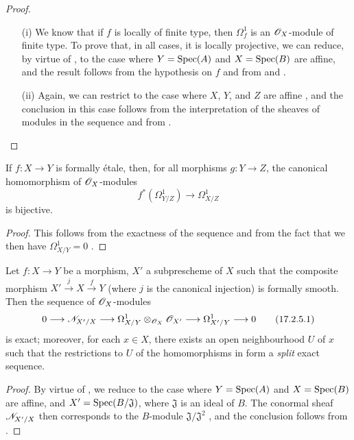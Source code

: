 \begin{proof}
\medskip\noindent
\begin{enumerate}
  \item[(i)] We know  that if $f$ is locally of finite type, then $\Omega_f^1$ is an $\mathscr{O}_X$-module of finite type. 
    To prove that, in all cases, it is locally projective, we can reduce, by virtue of , to the case where $Y=\operatorname{Spec}(A)$ and $X=\operatorname{Spec}(B)$ are affine, and the result follows from the hypothesis on $f$ and from  and .
  \item[(ii)] Again, we can restrict to the case where $X$, $Y$, and $Z$ are affine , and the conclusion in this case follows from the interpretation of the sheaves of modules in the sequence  and from .
\end{enumerate}
\end{proof}

\begin{corollary}[17.2.4]
\label{IV.17.2.4}
If $f:X\to Y$ is formally \'etale, then, for all morphisms $g:Y\to Z$, the canonical homomorphism of $\mathscr{O}_X$-modules
\[
  f^*(\Omega_{Y/Z}^1)\to\Omega_{X/Z}^1
\]
is bijective.
\end{corollary}

\begin{proof}
This follows from the exactness of the sequence  and from the fact that we then have $\Omega_{X/Y}^1=0$ .
\end{proof}

\begin{proposition}[17.2.5]
\label{IV.17.2.5}
Let $f:X\to Y$ be a morphism, $X'$ a subprescheme of $X$ such that the composite morphism $X'\xrightarrow{j}X\xrightarrow{f}Y$ (where $j$ is the canonical injection) is formally smooth.
Then the sequence of $\mathscr{O}_X$-modules 
\[
\label{IV.17.2.5.1}
  0\to\sh{N}_{X'/X}\to\Omega_{X/Y}^1\otimes_{\sh{O}_X}\sh{O}_{X'}\to\Omega_{X'/Y}^1\to 0
\tag{17.2.5.1}
\]
is exact; moreover, for each $x\in X$, there exists an open neighbourhood $U$ of $x$ such that the restrictions to $U$ of the homomorphisms in  form a \emph{split} exact sequence.
\end{proposition}

\begin{proof}
By virtue of , we reduce to the case where $Y=\operatorname{Spec}(A)$ and $X=\operatorname{Spec}(B)$ are affine, and $X'=\operatorname{Spec}(B/\mathfrak{J})$, where $\mathfrak{J}$ is an ideal of $B$. 
The conormal sheaf $\mathscr{N}_{X'/X}$ then corresponds to the $B$-module $\mathfrak{J}/\mathfrak{J}^2$ , and the conclusion follows from .
\end{proof}

